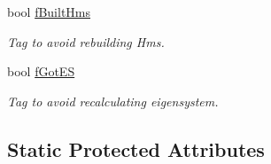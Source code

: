 \begin{DoxyCompactItemize}
bool \hyperlink{classOscProb_1_1PMNS__Base_a9ac3cadeac8db1b90f3152f476244780}{f\+Built\+Hms}
\begin{DoxyCompactList}\small\item\em Tag to avoid rebuilding Hms. \end{DoxyCompactList}\item 
bool \hyperlink{classOscProb_1_1PMNS__Base_a6dc5cd010d2d70b2324745b4e53e9839}{f\+Got\+ES}
\begin{DoxyCompactList}\small\item\em Tag to avoid recalculating eigensystem. \end{DoxyCompactList}\end{DoxyCompactItemize}
\subsection*{Static Protected Attributes}
